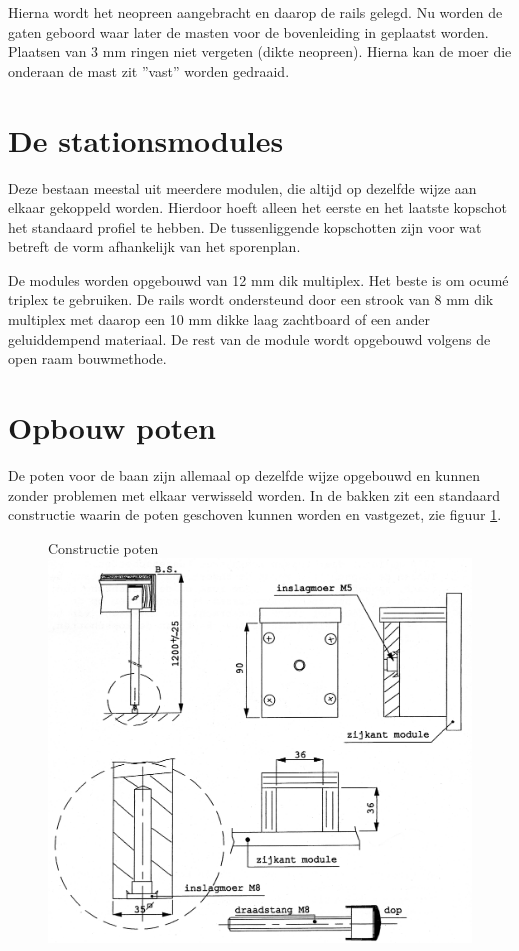 \documentclass[12pt,a4paper]{report}
\begin{document}
Hierna wordt het neopreen aangebracht en daarop de rails gelegd. Nu worden de gaten geboord waar later de masten voor de bovenleiding in geplaatst worden. 
Plaatsen van 3 mm ringen niet vergeten (dikte neopreen).
Hierna kan de moer die onderaan de mast zit ''vast'' worden gedraaid.

\section{De stationsmodules}
Deze bestaan meestal uit meerdere modulen, die altijd op dezelfde wijze aan elkaar gekoppeld worden. Hierdoor hoeft alleen het eerste en het laatste kopschot het standaard profiel te hebben. De tussenliggende kopschotten zijn voor wat betreft de vorm afhankelijk van het sporenplan.

De modules worden opgebouwd van 12 mm dik multiplex. Het beste is om ocum\'{e} triplex te gebruiken. De rails wordt ondersteund door een strook van 8 mm dik multiplex met daarop een 10 mm dikke laag zachtboard of een ander geluiddempend materiaal.
De rest van de module wordt opgebouwd volgens de open raam bouwmethode.

\section{Opbouw poten}
\label{se:poten}
De poten voor de baan zijn allemaal op dezelfde wijze opgebouwd en kunnen zonder problemen met elkaar verwisseld worden. In de bakken zit een standaard constructie waarin de poten geschoven kunnen worden en vastgezet, zie figuur \ref{figuur2}.

\begin{figure}[!ht]
  \captionbox
  {Constructie poten\label{figuur2}}
  {\includegraphics[scale=0.3]{images/rcu_figuur2}}
\end{figure}
\end{document}
